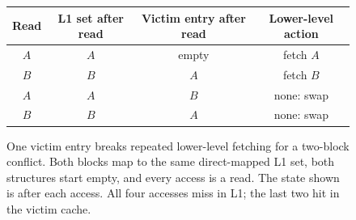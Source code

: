 \begin{figure}[htbp]
  \centering
  \begin{tabular}{cccc}
    \toprule
    Read & L1 set after read & Victim entry after read & Lower-level action \\
    \midrule
    $A$ & $A$ & empty & fetch $A$ \\
    $B$ & $B$ & $A$ & fetch $B$ \\
    $A$ & $A$ & $B$ & none: swap \\
    $B$ & $B$ & $A$ & none: swap \\
    \bottomrule
  \end{tabular}
  \caption{One victim entry breaks repeated lower-level fetching for a two-block conflict. Both blocks map to the same direct-mapped L1 set, both structures start empty, and every access is a read. The state shown is after each access. All four accesses miss in L1; the last two hit in the victim cache.}
  \label{fig:victim-cache-swap}
\end{figure}
